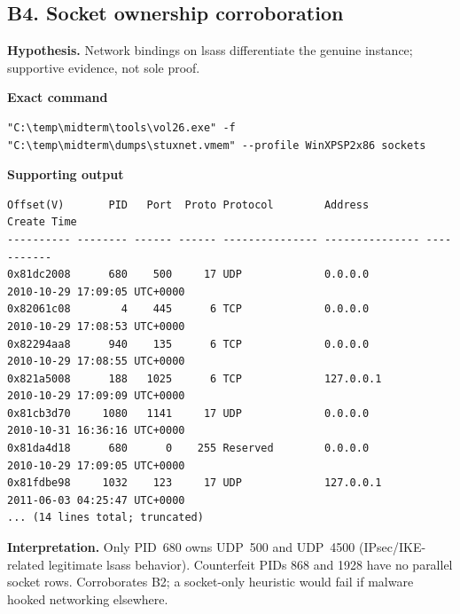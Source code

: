 \documentclass[11pt,letterpaper]{article}
\begin{document}
\subsection*{B4. Socket ownership corroboration}
\textbf{Hypothesis.} Network bindings on lsass differentiate the genuine instance; supportive evidence, not sole proof.
\par\medskip\noindent\textbf{Exact command}
\begin{lstlisting}
"C:\temp\midterm\tools\vol26.exe" -f "C:\temp\midterm\dumps\stuxnet.vmem" --profile WinXPSP2x86 sockets
\end{lstlisting}
\noindent\textbf{Supporting output}
\begin{lstlisting}
Offset(V)       PID   Port  Proto Protocol        Address         Create Time
---------- -------- ------ ------ --------------- --------------- -----------
0x81dc2008      680    500     17 UDP             0.0.0.0         2010-10-29 17:09:05 UTC+0000
0x82061c08        4    445      6 TCP             0.0.0.0         2010-10-29 17:08:53 UTC+0000
0x82294aa8      940    135      6 TCP             0.0.0.0         2010-10-29 17:08:55 UTC+0000
0x821a5008      188   1025      6 TCP             127.0.0.1       2010-10-29 17:09:09 UTC+0000
0x81cb3d70     1080   1141     17 UDP             0.0.0.0         2010-10-31 16:36:16 UTC+0000
0x81da4d18      680      0    255 Reserved        0.0.0.0         2010-10-29 17:09:05 UTC+0000
0x81fdbe98     1032    123     17 UDP             127.0.0.1       2011-06-03 04:25:47 UTC+0000
... (14 lines total; truncated)
\end{lstlisting}
\noindent\textbf{Interpretation.} Only PID~680 owns UDP~500 and UDP~4500 (IPsec/IKE-related legitimate lsass behavior). Counterfeit PIDs 868 and 1928 have no parallel socket rows. Corroborates B2; a socket-only heuristic would fail if malware hooked networking elsewhere.
\vspace{0.55em}
\end{document}
